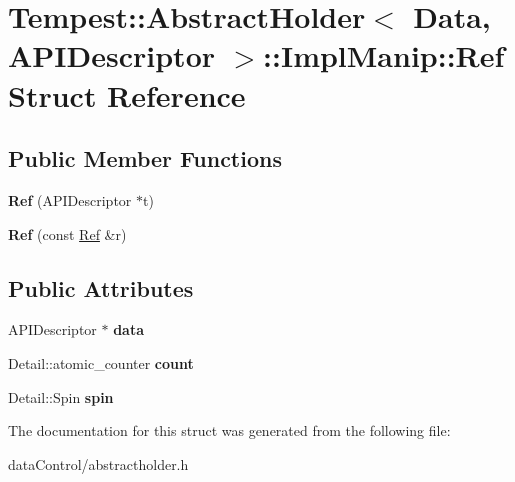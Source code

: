 \hypertarget{struct_tempest_1_1_abstract_holder_1_1_impl_manip_1_1_ref}{\section{Tempest\+:\+:Abstract\+Holder$<$ Data, A\+P\+I\+Descriptor $>$\+:\+:Impl\+Manip\+:\+:Ref Struct Reference}
\label{struct_tempest_1_1_abstract_holder_1_1_impl_manip_1_1_ref}
}
\subsection*{Public Member Functions}
\begin{DoxyCompactItemize}
\item 
\hypertarget{struct_tempest_1_1_abstract_holder_1_1_impl_manip_1_1_ref_a0901c0305cf383b5b30458988e205c51}{{\bfseries Ref} (A\+P\+I\+Descriptor $\ast$t)}\label{struct_tempest_1_1_abstract_holder_1_1_impl_manip_1_1_ref_a0901c0305cf383b5b30458988e205c51}

\item 
\hypertarget{struct_tempest_1_1_abstract_holder_1_1_impl_manip_1_1_ref_a4be9d02f1817971103935bf6c1ac6476}{{\bfseries Ref} (const \hyperlink{struct_tempest_1_1_abstract_holder_1_1_impl_manip_1_1_ref}{Ref} \&r)}\label{struct_tempest_1_1_abstract_holder_1_1_impl_manip_1_1_ref_a4be9d02f1817971103935bf6c1ac6476}

\end{DoxyCompactItemize}
\subsection*{Public Attributes}
\begin{DoxyCompactItemize}
\item 
\hypertarget{struct_tempest_1_1_abstract_holder_1_1_impl_manip_1_1_ref_a36e29af183369c5d5eff13de1702df59}{A\+P\+I\+Descriptor $\ast$ {\bfseries data}}\label{struct_tempest_1_1_abstract_holder_1_1_impl_manip_1_1_ref_a36e29af183369c5d5eff13de1702df59}

\item 
\hypertarget{struct_tempest_1_1_abstract_holder_1_1_impl_manip_1_1_ref_a2c2691efc893deafe227586d3dec87af}{Detail\+::atomic\+\_\+counter {\bfseries count}}\label{struct_tempest_1_1_abstract_holder_1_1_impl_manip_1_1_ref_a2c2691efc893deafe227586d3dec87af}

\item 
\hypertarget{struct_tempest_1_1_abstract_holder_1_1_impl_manip_1_1_ref_a6664b6d53d7a679d2bfa95d9beefc702}{Detail\+::\+Spin {\bfseries spin}}\label{struct_tempest_1_1_abstract_holder_1_1_impl_manip_1_1_ref_a6664b6d53d7a679d2bfa95d9beefc702}

\end{DoxyCompactItemize}


The documentation for this struct was generated from the following file\+:\begin{DoxyCompactItemize}
\item 
data\+Control/abstractholder.\+h\end{DoxyCompactItemize}
